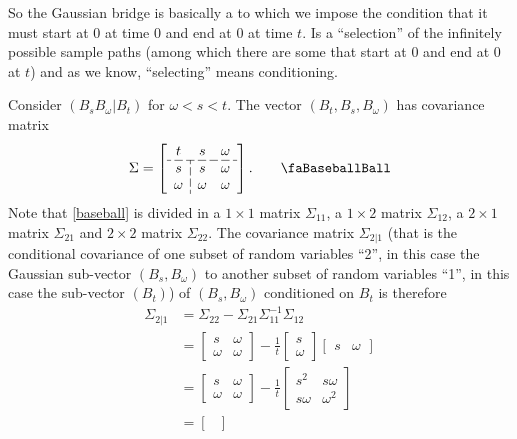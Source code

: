 \documentclass[12pt]{report}
\begin{document}
So the Gaussian bridge is basically a \bwm{} to which we impose the condition that it must start at 0 at time 0 and end at 0 at time $t$. Is a ``selection'' of the infinitely possible sample paths (among which there are some that start at 0 and end at 0 at $t$) and as we know, ``selecting'' means conditioning.
\begin{fancyproof}
	Consider $(B_{s}B_{\omega}|B_{t})$ for $\omega<s<t$. The vector $(B_{t},B_{s},B_{\omega})$ has covariance matrix
	\begin{equation*}
		\Sigma=\left[\begin{array}{c;{6pt/2pt}cc}
			t&s&\omega\\ \hdashline[6pt/2pt]
			s&s&\omega\\
			\omega&\omega&\omega
		\end{array}\right].\tag*{\faBaseballBall}\label{baseball}
	\end{equation*}
	Note that \ref{baseball} is divided in a $1\times 1$ matrix $\Sigma_{11}$, a $1\times 2$ matrix $\Sigma_{12}$, a $2\times 1$ matrix $\Sigma_{21}$ and $2\times2$ matrix $\Sigma_{22}$. The covariance matrix $\Sigma_{2|1}$ (that is the conditional covariance of one subset of random variables ``2'', in this case the Gaussian sub-vector $(B_{s},B_{\omega})$ to another subset of random variables ``1'', in this case the sub-vector $(B_{t})$) of $(B_{s},B_{\omega})$ conditioned on $B_{t}$ is therefore 
	\begin{align*}
		\Sigma_{2|1}&=\Sigma_{22}-\Sigma_{21}\Sigma_{11}^{-1}\Sigma_{12}\\
		&=\begin{bmatrix}
			s&\omega\\
			\omega&\omega
		\end{bmatrix}-\frac{1}{t}\begin{bmatrix}
		s\\ \omega
		\end{bmatrix}\begin{bmatrix}
		s&\omega
		\end{bmatrix}\\
		&=\begin{bmatrix}
			s&\omega\\
			\omega&\omega
		\end{bmatrix}-\frac{1}{t}\begin{bmatrix}
		s^{2}&s\omega\\
		s\omega&\omega^{2}
		\end{bmatrix}\\
		&=\begin{bmatrix}

\end{bmatrix}
\end{align*}
\end{fancyproof}
\end{document}
